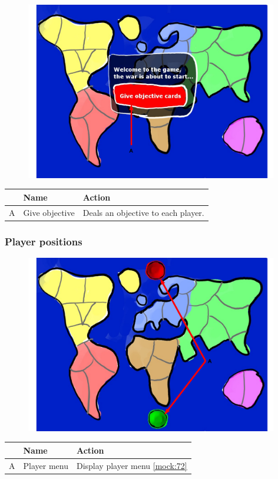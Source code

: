 \documentclass[12pt,a4paper]{article}
\begin{document}
\begin{figure}[H]
  \centering
  \includegraphics[width=11cm]{pic/mocks/3-1.pdf}
\end{figure}

\begin{table}[H]
\small
\centering
\begin{tabular}{c|p{5cm}|p{7cm}}
& Name & Action \\ \hline\hline
A
&Give objective
&Deals an objective to each player.
\end{tabular}
\end{table}


\subsubsection{Player positions}\label{mock:732}

\begin{figure}[H]
  \centering
  \includegraphics[width=11cm]{pic/mocks/3-2.pdf}
\end{figure}

\begin{table}[H]
\small
\centering
\begin{tabular}{c|p{5cm}|p{7cm}}
& Name & Action \\ \hline\hline
A
&Player menu
&Display player menu \ref{mock:72}
\end{tabular}
\end{table}
\end{document}

